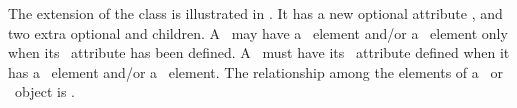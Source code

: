 The extension of the \Species class is illustrated in . \mBlockChangedBegin{\revTwentyTwentyMarch}It\mBlockChangedEnd{\revTwentyTwentyMarch} has a new optional attribute \speciesTypeAtt, and two extra optional \ListOfOutwardBindingSites and \ListOfSpeciesFeatures children. A \species\ may have a \mBlockChangedBegin{\revTwentyTwentyMarch}\ListOfOutwardBindingSites\ element \mBlockChangedEnd{\revTwentyTwentyMarch} and/or a \mBlockChangedBegin{\revTwentyTwentyMarch}\ListOfSpeciesFeatures\ element\mBlockChangedEnd{\revTwentyTwentyMarch} only when its \speciesTypeAtt\ attribute has been defined.  A \species\ must have its \speciesTypeAtt\ attribute defined when it has a \mBlockChangedBegin{\revTwentyTwentyMarch}\ListOfOutwardBindingSites\ element\mBlockChangedEnd{\revTwentyTwentyMarch} and/or a \mBlockChangedBegin{\revTwentyTwentyMarch} \ListOfSpeciesFeatures\ element\mBlockChangedEnd{\revTwentyTwentyMarch}. The relationship among the elements of a \mBlockChangedBegin{\revTwentyTwentyMarch} \ListOfOutwardBindingSites\ or \ListOfSpeciesFeatures\ object\mBlockChangedEnd{\revTwentyTwentyMarch} is . 

